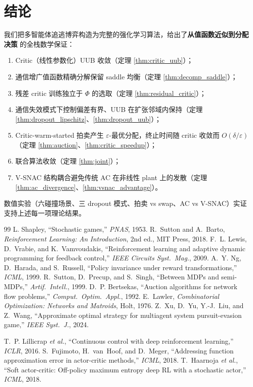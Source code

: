 \documentclass[11pt,a4paper]{article}
\theoremstyle{remark}
\begin{document}
\section{结论}

我们把多智能体追逃博弈构造为完整的强化学习算法，给出了\textbf{从值函数近似到分配决策} 的全栈数学保证：

\begin{enumerate}
\item Critic（线性参数化）UUB 收敛（定理 \ref{thm:critic_uub}）；
\item 通信增广值函数精确分解保留 saddle 均衡（定理 \ref{thm:decomp_saddle}）；
\item 残差 critic 训练独立于 $\Phi$ 的选取（定理 \ref{thm:residual_critic}）；
\item 通信失效模式下控制偏差有界、UUB 在扩张邻域内保持（定理 \ref{thm:dropout_lipschitz}、\ref{thm:dropout_uub}）；
\item Critic-warm-started 拍卖产生 $\varepsilon$-最优分配，终止时间随 critic 收敛而 $O(\delta/\varepsilon)$（定理 \ref{thm:auction}、\ref{thm:critic_speedup}）；
\item 联合算法收敛（定理 \ref{thm:joint}）；
\item V-SNAC 结构耦合避免传统 AC 在非线性 plant 上的发散（定理 \ref{thm:ac_divergence}、\ref{thm:vsnac_advantage}）。
\end{enumerate}

数值实验（六碰撞场景、三 dropout 模式、拍卖 vs swap、AC vs V-SNAC）实证支持上述每一项理论结果。

\begin{thebibliography}{99}
 L. Shapley, ``Stochastic games,'' \emph{PNAS}, 1953.
 R.~Sutton and A.~Barto, \emph{Reinforcement Learning: An Introduction}, 2nd ed., MIT Press, 2018.
 F.~L. Lewis, D.~Vrabie, and K.~Vamvoudakis, ``Reinforcement learning and adaptive dynamic programming for feedback control,'' \emph{IEEE Circuits Syst.\ Mag.}, 2009.
 A.~Y. Ng, D.~Harada, and S.~Russell, ``Policy invariance under reward transformations,'' \emph{ICML}, 1999.
 R.~Sutton, D.~Precup, and S.~Singh, ``Between MDPs and semi-MDPs,'' \emph{Artif.\ Intell.}, 1999.
 D.~P. Bertsekas, ``Auction algorithms for network flow problems,'' \emph{Comput.\ Optim.\ Appl.}, 1992.
 E.~Lawler, \emph{Combinatorial Optimization: Networks and Matroids}, Holt, 1976.
 Z.~Xu, D.~Yu, Y.-J.~Liu, and Z.~Wang, ``Approximate optimal strategy for multiagent system pursuit-evasion game,'' \emph{IEEE Syst.\ J.}, 2024.

 T.~P. Lillicrap \emph{et al.}, ``Continuous control with deep reinforcement learning,'' \emph{ICLR}, 2016.
 S.~Fujimoto, H.~van~Hoof, and D.~Meger, ``Addressing function approximation error in actor-critic methods,'' \emph{ICML}, 2018.
 T.~Haarnoja \emph{et al.}, ``Soft actor-critic: Off-policy maximum entropy deep RL with a stochastic actor,'' \emph{ICML}, 2018.
\end{thebibliography}
\end{document}
